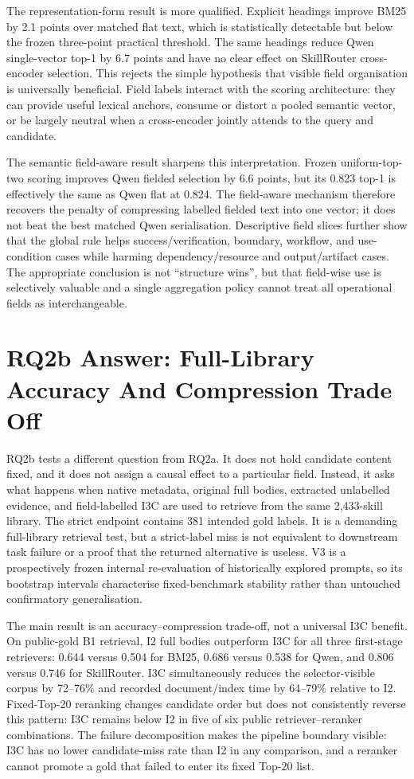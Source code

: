 The representation-form result is more qualified. Explicit headings improve BM25 by 2.1 points over matched flat text, which is statistically detectable but below the frozen three-point practical threshold. The same headings reduce Qwen single-vector top-1 by 6.7 points and have no clear effect on SkillRouter cross-encoder selection. This rejects the simple hypothesis that visible field organisation is universally beneficial. Field labels interact with the scoring architecture: they can provide useful lexical anchors, consume or distort a pooled semantic vector, or be largely neutral when a cross-encoder jointly attends to the query and candidate.

The semantic field-aware result sharpens this interpretation. Frozen uniform-top-two scoring improves Qwen fielded selection by 6.6 points, but its 0.823 top-1 is effectively the same as Qwen flat at 0.824. The field-aware mechanism therefore recovers the penalty of compressing labelled fielded text into one vector; it does not beat the best matched Qwen serialisation. Descriptive field slices further show that the global rule helps success/verification, boundary, workflow, and use-condition cases while harming dependency/resource and output/artifact cases. The appropriate conclusion is not ``structure wins'', but that field-wise use is selectively valuable and a single aggregation policy cannot treat all operational fields as interchangeable.

\section{RQ2b Answer: Full-Library Accuracy And Compression Trade Off}

RQ2b tests a different question from RQ2a. It does not hold candidate content fixed, and it does not assign a causal effect to a particular field. Instead, it asks what happens when native metadata, original full bodies, extracted unlabelled evidence, and field-labelled I3C are used to retrieve from the same 2,433-skill library. The strict endpoint contains 381 intended gold labels. It is a demanding full-library retrieval test, but a strict-label miss is not equivalent to downstream task failure or a proof that the returned alternative is useless. V3 is a prospectively frozen internal re-evaluation of historically explored prompts, so its bootstrap intervals characterise fixed-benchmark stability rather than untouched confirmatory generalisation.

The main result is an accuracy--compression trade-off, not a universal I3C benefit. On public-gold B1 retrieval, I2 full bodies outperform I3C for all three first-stage retrievers: 0.644 versus 0.504 for BM25, 0.686 versus 0.538 for Qwen, and 0.806 versus 0.746 for SkillRouter. I3C simultaneously reduces the selector-visible corpus by 72--76\% and recorded document/index time by 64--79\% relative to I2. Fixed-Top-20 reranking changes candidate order but does not consistently reverse this pattern: I3C remains below I2 in five of six public retriever--reranker combinations. The failure decomposition makes the pipeline boundary visible: I3C has no lower candidate-miss rate than I2 in any comparison, and a reranker cannot promote a gold that failed to enter its fixed Top-20 list.

